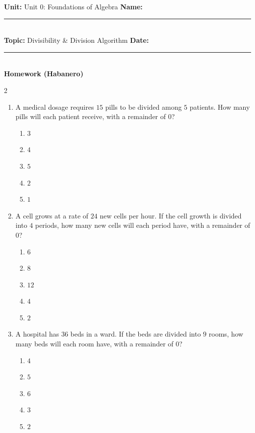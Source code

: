 \documentclass[10pt]{article}
\begin{document}
\enlargethispage{2.5cm}

\begin{tcolorbox}[colback=mainblue!5, colframe=mainblue, sharp corners, boxrule=0.5pt]
    \small \textbf{Unit:} Unit 0: Foundations of Algebra \hfill \textbf{Name:} \rule{3cm}{0.4pt} \\
    \small \textbf{Topic:} Divisibility & Division Algorithm \hfill \textbf{Date:} \rule{2cm}{0.4pt} \\
    \centering \textbf{\large Homework (Habanero)}
\end{tcolorbox}

\vspace{0.2cm}

\begin{multicols}{2}
\begin{enumerate}[label=\textbf{Q\arabic*.}, leftmargin=*, itemsep=6pt, parsep=0pt]

  \item \small A medical dosage requires $15$ pills to be divided among $5$ patients. How many pills will each patient receive, with a remainder of $0$?
  \begin{enumerate}[label=(\Alph*), leftmargin=0.6cm, nosep, itemsep=2pt]
    \item $3$
    \item $4$
    \item $5$
    \item $2$
    \item $1$
  \end{enumerate}

  \item \small A cell grows at a rate of $24$ new cells per hour. If the cell growth is divided into $4$ periods, how many new cells will each period have, with a remainder of $0$?
  \begin{enumerate}[label=(\Alph*), leftmargin=0.6cm, nosep, itemsep=2pt]
    \item $6$
    \item $8$
    \item $12$
    \item $4$
    \item $2$
  \end{enumerate}

  \item \small A hospital has $36$ beds in a ward. If the beds are divided into $9$ rooms, how many beds will each room have, with a remainder of $0$?
  \begin{enumerate}[label=(\Alph*), leftmargin=0.6cm, nosep, itemsep=2pt]
    \item $4$
    \item $5$
    \item $6$
    \item $3$
    \item $2$
  \end{enumerate}


\end{enumerate}
\end{multicols}
\end{document}
